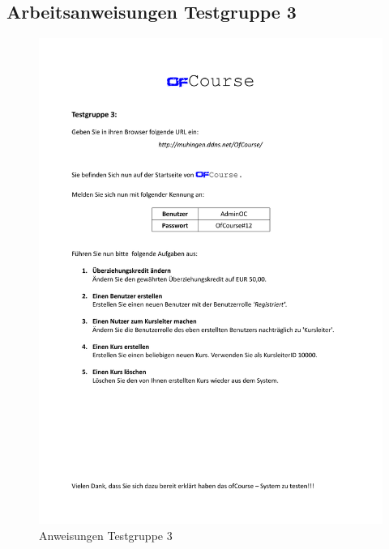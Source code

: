 \subsection*{Arbeitsanweisungen Testgruppe 3}
\begin{figure}[h]
	\centering
	\includegraphics[width=0.9\linewidth, page=1]{pdf/AnweisungenTestgruppe3}
	\caption{Anweisungen Testgruppe 3}
	\label{fig:Anweisungen3}
\end{figure}